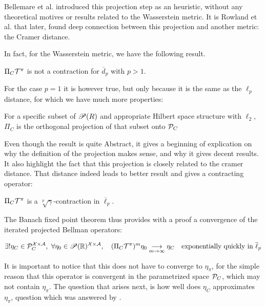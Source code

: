 Bellemare et al. introduced this projection step as an heuristic, without any theoretical motives or results related to the Wasserstein metric. It is Rowland et al. that later, found deep connection between this projection and another metric: the Cramer distance.

In fact, for the Wasserstein metric, we have the following result.
\begin{proposition}
    $\Pi_C\mathcal{T}^\pi$ is not a contraction for $\overline{d}_p$ with $p > 1$.
\end{proposition}
For the case $p=1$ it is however true, but only because it is the same as the $\ell_p$ distance, for which we have much more properties:

\begin{proposition}
    For a specific subset of $\mathscr{P}(R)$ and appropriate Hilbert space structure with $\ell_2$, $\Pi_C$ is the orthogonal projection of that subset onto $\mathcal{P}_C$
\end{proposition}
Even though the result is quite Abstract, it gives a beginning of explication on why the definition of the projection makes sense, and why it gives decent results. It also highlight the fact that this projection is closely related to the cramer distance. That distance indeed leads to better result and gives a contracting operator:

\begin{proposition}
    $\Pi_C\mathcal{T}^\pi$ is a $\sqrt[p]\gamma$-contraction in $\overline{\ell}_p$.
\end{proposition}

The Banach fixed point theorem thus provides with a proof a convergence of the iterated projected Bellman operators:

\begin{equation}\label{ProjBellmanCatConv}
    \exists ! \eta_C \in \mathcal{P}_C^{\mathcal{X} \times \mathcal{A}}, \ \forall \eta_0 \in \mathscr{P}(\mathbb{R})^{\mathcal{X} \times \mathcal{A}},\quad (\Pi_C\mathcal{T}^\pi)^m\eta_0 \underset{m \rightarrow \infty}{\longrightarrow} \eta_C \quad \text{exponentially quickly in } \overline{\ell}_p
\end{equation}


It is important to notice that this does not have to converge to $\eta_\pi$, for the simple reason that this operator is convergent in the parametrized space $\mathcal{P}_C$, which may not contain $\eta_\pi$. The question that arises next, is how well does $\eta_C$ approximates $\eta_\pi$, question which was answered by \cite[Rowland et al.]{rowland_analysis_2018}.

